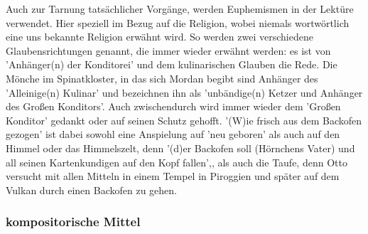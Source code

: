 Auch zur Tarnung tatsächlicher Vorgänge, werden Euphemismen in der Lektüre verwendet. Hier speziell im Bezug auf die Religion, wobei niemals wortwörtlich eine uns bekannte Religion erwähnt wird. So werden zwei verschiedene Glaubensrichtungen genannt, die immer wieder erwähnt werden: es ist von 'Anhänger(n) der Konditorei'\cite[S.588]{pir} und dem kulinarischen Glauben die Rede. \cite[S.588]{pir} Die Mönche im Spinatkloster, in das sich Mordan begibt \cite[S.400ff]{pir} sind Anhänger des 'Alleinige(n) Kulinar'\cite[S.472]{pir} und bezeichnen ihn als 'unbändige(n) Ketzer und Anhänger des Großen Konditors'.\cite[S.472]{pir} Auch zwischendurch wird immer wieder dem 'Großen Konditor' gedankt \cite[S.246]{pir} oder auf seinen Schutz gehofft.\cite[S.157]{pir} '(W)ie frisch aus dem Backofen gezogen'\cite[S.131]{pir} ist dabei sowohl eine Anspielung auf 'neu geboren' als auch auf den Himmel oder das Himmelszelt, denn '(d)er Backofen soll (Hörnchens Vater) und all seinen Kartenkundigen auf den Kopf fallen',\cite[S.359]{pir}, als auch die Taufe, denn Otto versucht mit allen Mitteln in einem Tempel in Piroggien \cite[S.479]{pir} und später auf dem Vulkan durch einen Backofen zu gehen.\cite[S.494]{pir}

\subsubsection{kompositorische Mittel}

